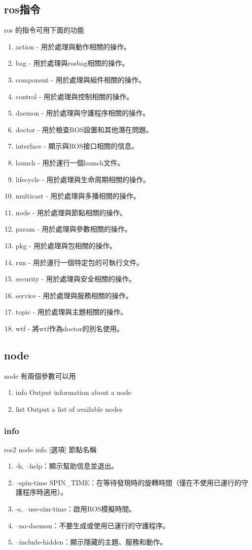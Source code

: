 \subsection{ros指令}
ros 的指令可用下面的功能
\begin{enumerate}
    \item action - 用於處理與動作相關的操作。
    \item bag - 用於處理與rosbag相關的操作。
    \item component - 用於處理與組件相關的操作。
    \item control - 用於處理與控制相關的操作。
    \item daemon - 用於處理與守護程序相關的操作。
    \item doctor - 用於檢查ROS設置和其他潛在問題。
    \item interface - 顯示與ROS接口相關的信息。
    \item launch - 用於運行一個launch文件。
    \item lifecycle - 用於處理與生命周期相關的操作。
    \item multicast - 用於處理與多播相關的操作。
    \item node - 用於處理與節點相關的操作。
    \item param - 用於處理與參數相關的操作。
    \item pkg - 用於處理與包相關的操作。
    \item run - 用於運行一個特定包的可執行文件。
    \item security - 用於處理與安全相關的操作。
    \item service - 用於處理與服務相關的操作。
    \item topic - 用於處理與主題相關的操作。
    \item wtf - 將wtf作為doctor的別名使用。
\end{enumerate}

\subsection{node}
node 有兩個參數可以用
\begin{enumerate}
    \item info  Output information about a node
    \item list  Output a list of available nodes
\end{enumerate}
\subsubsection{info}
ros2 node info [選項] 節點名稱
\begin{enumerate}
    \item -h, --help：顯示幫助信息並退出。
    \item --spin-time SPIN\_TIME：在等待發現時的旋轉時間（僅在不使用已運行的守護程序時適用）。
    \item -s, --use-sim-time：啟用ROS模擬時間。
    \item --no-daemon：不要生成或使用已運行的守護程序。
    \item --include-hidden：顯示隱藏的主題、服務和動作。
\end{enumerate}
